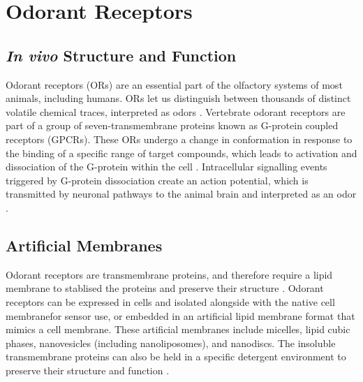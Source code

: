 \documentclass[
  a4paper,
]{scrbook}
\begin{document}
\hypertarget{sec-odorant-receptors}{%
\section{Odorant Receptors}\label{sec-odorant-receptors}}

\hypertarget{in-vivo-structure-and-function}{%
\subsection{\texorpdfstring{\emph{In vivo} Structure and
Function}{In vivo Structure and Function}}\label{in-vivo-structure-and-function}}

Odorant receptors (ORs) are an essential part of the olfactory systems
of most animals, including humans. ORs let us distinguish between
thousands of distinct volatile chemical traces, interpreted as odors
\autocite{Buck1991,Dung2018}. Vertebrate odorant receptors are part of a
group of seven-transmembrane proteins known as G-protein coupled
receptors (GPCRs). These ORs undergo a change in conformation in
response to the binding of a specific range of target compounds, which
leads to activation and dissociation of the G-protein within the cell
\autocite{Buck1991,Dung2018,Zhang2021}. Intracellular signalling events
triggered by G-protein dissociation create an action potential, which is
transmitted by neuronal pathways to the animal brain and interpreted as
an odor \autocite{Buck1991,Dung2018}.

\hypertarget{sec-artificial-membranes}{%
\subsection{Artificial Membranes}\label{sec-artificial-membranes}}

Odorant receptors are transmembrane proteins, and therefore require a
lipid membrane to stablised the proteins and preserve their structure
\autocite{Dung2018}. Odorant receptors can be expressed in cells and
isolated alongside with the native cell membranefor sensor use, or
embedded in an artificial lipid membrane format that mimics a cell
membrane. These artificial membranes include micelles, lipid cubic
phases, nanovesicles (including nanoliposomes), and nanodiscs. The
insoluble transmembrane proteins can also be held in a specific
detergent environment to preserve their structure and function
\autocite{Dung2018}.
\end{document}
